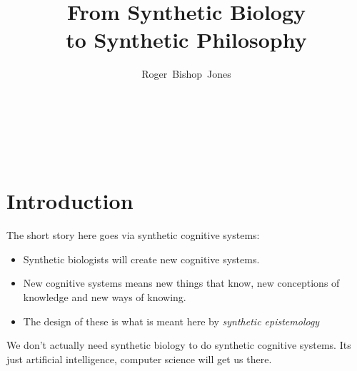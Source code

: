 \documentclass[14pt,titlepage]{extarticle}
\title{From Synthetic Biology \\to Synthetic Philosophy}
\author{Roger~Bishop~Jones}
\date{\ }
\newcommand{\ignore}[1]{}
\begin{document}

                               
\begin{titlepage}
\maketitle





\end{titlepage}

\ \

\ignore{
\begin{centering}
{\LARGE \bf From \\Synthetic Biology \\to \\Synthetic Philosophy\\}
\end{centering}
}%

\setcounter{tocdepth}{1}
{\parskip-0pt\tableofcontents}




\section{Introduction}

The short story here goes via synthetic cognitive systems:
\begin{itemize}
\item Synthetic biologists will create new cognitive systems.
\item New cognitive systems means new things that know, new conceptions of knowledge and new ways of knowing.
\item The design of these is what is meant here by {\it synthetic epistemology}
\end{itemize}

We don't actually need synthetic biology to do synthetic cognitive systems.
Its just artificial intelligence, computer science will get us there.
\end{document}
